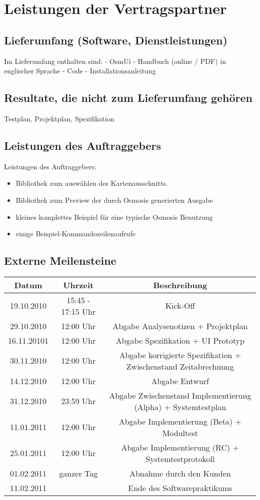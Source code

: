 \documentclass[a4paper,10pt]{scrartcl}
\begin{document}
\section{Leistungen der Vertragspartner}
\subsection{Lieferumfang (Software, Dienstleistungen)}
Im Lieferumfang enthalten sind:
- OsmUi
- Handbuch (online / PDF) in englischer Sprache
- Code
- Installationsanleitung
\subsection{Resultate, die nicht zum Lieferumfang gehören}
Testplan, Projektplan, Spezifikation
\subsection{Leistungen des Auftraggebers}
Leistungen des Auftraggebers:
\begin{itemize}
\item Bibliothek zum auswählen des Kartenausschnitts.
\item Bibliothek zum Preview der durch Osmosis generierten Ausgabe
\item kleines komplettes Beispiel für eine typische Osmosis Benutzung
\item einige Beispiel-Kommandozeilenaufrufe
\end{itemize}


\subsection{Externe Meilensteine}
\begin{tabular}{|c|c|c|}
\hline Datum & Uhrzeit & Beschreibung\\ 
\hline 19.10.2010 & 15:45 - 17:15 Uhr & Kick-Off\\ 
\hline 29.10.2010 & 12:00 Uhr & Abgabe Analysenotizen + Projektplan\\ 
\hline 16.11.20101 & 12:00 Uhr & Abgabe Spezifikation + UI Prototyp\\ 
\hline 30.11.2010 & 12:00 Uhr & Abgabe korrigierte Spezifikation + Zwischenstand Zeitabrechnung\\ 
\hline 14.12.2010 & 12:00 Uhr & Abgabe Entwurf\\ 
\hline 31.12.2010 & 23:59 Uhr & Abgabe Zwischenstand Implementierung (Alpha) + Systemtestplan\\ 
\hline 11.01.2011 & 12:00 Uhr & Abgabe Implementierung (Beta) + Modultest\\ 
\hline 25.01.2011 & 12:00 Uhr & Abgabe Implementierung (RC) + Systemtestprotokoll\\ 
\hline 01.02.2011 & ganzer Tag & Abnahme durch den Kunden\\ 
\hline 11.02.2011 & & Ende des Softwarepraktikums\\ 
\hline 
\end{tabular} 
\end{document}
